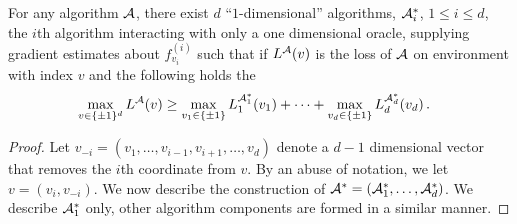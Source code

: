 \begin{lemma}
\label{lemma:sep}
For any algorithm $\mathcal{A}$, there exist  $d$ ``$1$-dimensional'' algorithms, $\mathcal{A}_i^*$, $1\le i \le d$,
the $i$th algorithm interacting with only a one dimensional oracle, supplying gradient estimates about $f_{v_i}^{(i)}$ 
such that if $L^{\mathcal{A}}(v)$ is the loss of $\mathcal{A}$ on environment with index $v$ and the following holds
the 
\begin{align}
\label{eq:onedimlb}
&\max_{v\in \{\pm 1\}^d} L^{\mathcal{A}}(v) 
\ge   \max_{v_1\in \{\pm 1\}} L_1^{\mathcal{A}_1^*}(v_1) + \dots + \max_{v_d\in \{\pm 1 \}} L_d^{\mathcal{A}^*_d}(v_d)\,.
\end{align}
\end{lemma}
\begin{proof}
Let $v_{-i}=(v_1,\ldots,v_{i-1},v_{i+1},\ldots,v_d)$ denote a $d-1$ dimensional vector that removes the $i$th coordinate from $v$. By an abuse of notation, we let $v=(v_i, v_{-i})$. 
We now describe the construction of $\mathcal{A}^*=(\mathcal{A}_1^*, \ldots, \mathcal{A}_d^*)$.
We describe $\mathcal{A}_1^*$ only, other algorithm components are formed in a similar manner.


\end{proof}

